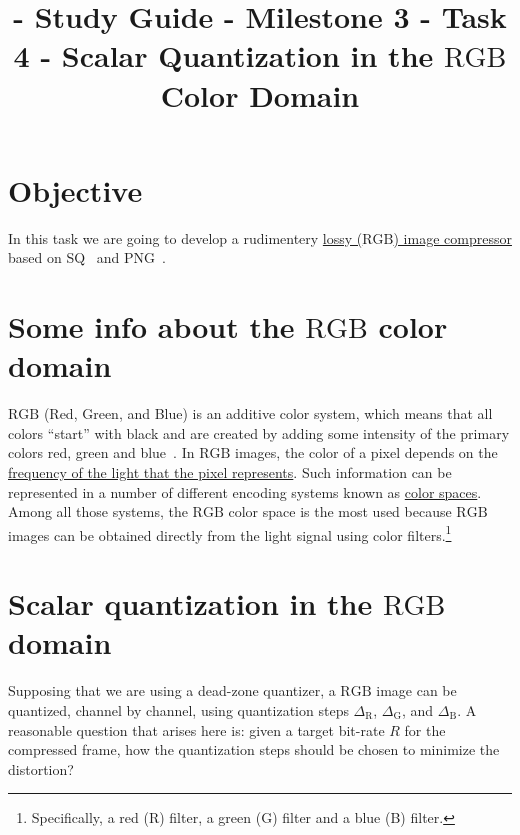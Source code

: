 

\title{\SM{} - Study Guide - Milestone 3 - Task 4 - Scalar Quantization in the $\text{RGB}$ Color Domain}

\maketitle

\tableofcontents

\section{Objective}
In this task we are going to develop a rudimentery \href{https://en.wikipedia.org/wiki/Lossy_compression}{lossy
($\text{RGB}$) image compressor} based on
SQ~\cite{vruiz__scalar_quantization} and PNG~\cite{vruiz__PNG}. 

\section{Some info about the $\text{RGB}$ color domain}

$\text{RGB}$ (Red, Green, and Blue) is an additive color system, which
means that all colors ``start'' with black and are created by adding
some intensity of the primary colors red, green and
blue~\cite{burger2016digital}. In $\text{RGB}$ images, the color of a
pixel depends on the
\href{https://en.wikipedia.org/wiki/Visible_spectrum}{frequency of the
  light that the pixel represents}. Such information can be
represented in a number of different encoding systems known as
\href{https://en.wikipedia.org/wiki/Color_space}{color spaces}. Among
all those systems, the $\text{RGB}$ color space is the most used
because $\text{RGB}$ images can be obtained directly from the light
signal using color filters.\footnote{Specifically, a red (R) filter, a
green (G) filter and a blue (B) filter.}


\section{Scalar quantization in the $\text{RGB}$ domain}

Supposing that we are using a dead-zone quantizer, a $\text{RGB}$
image can be quantized, channel by channel, using quantization steps
$\Delta_{\text{R}}$, $\Delta_{\text{G}}$, and $\Delta_{\text{B}}$. A
reasonable question that arises here is: given a target bit-rate $R$
for the compressed frame, how the quantization steps should be chosen
to minimize the distortion?

